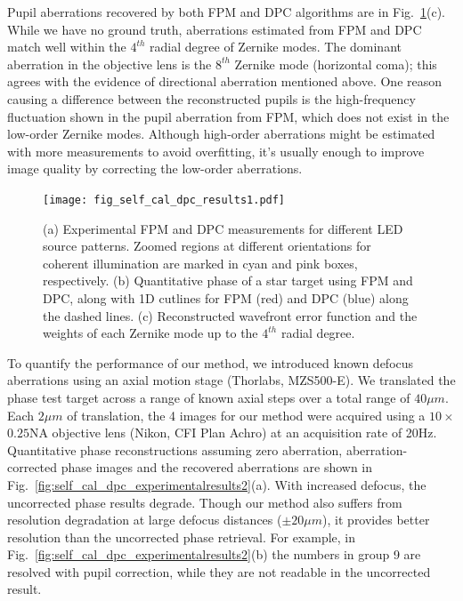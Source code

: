 Pupil aberrations recovered by both FPM and DPC algorithms are in Fig.~\ref{fig:self_cal_dpc_experimentalresults1}(c). While we have no ground truth, aberrations estimated from FPM and DPC match well within the $4^{th}$ radial degree of Zernike modes. The dominant aberration in the objective lens is the $8^{th}$ Zernike mode (horizontal coma); this agrees with the evidence of directional aberration mentioned above. One reason causing a difference between the reconstructed pupils is the high-frequency fluctuation shown in the pupil aberration from FPM, which does not exist in the low-order Zernike modes. Although high-order aberrations might be estimated with more measurements to avoid overfitting, it's usually enough to improve image quality by correcting the low-order aberrations.

\begin{figure}[ht!]
\centering\texttt{[image: fig\_self\_cal\_dpc\_results1.pdf]}
\caption{\label{fig:self_cal_dpc_experimentalresults1} (a) Experimental FPM and DPC measurements for different LED source patterns. Zoomed regions at different orientations for coherent illumination are marked in cyan and pink boxes, respectively. (b) Quantitative phase of a star target using FPM and DPC, along with 1D cutlines for FPM (red) and DPC (blue) along the dashed lines. (c) Reconstructed wavefront error function and the weights of each Zernike mode up to the $4^{th}$ radial degree.}
\end{figure}

To quantify the performance of our method, we introduced known defocus aberrations using an axial motion stage (Thorlabs, MZS500-E). We translated the phase test target across a range of known axial steps over a total range of $40 \mu m$. Each $2 \mu m$ of translation, the 4 images for our method were acquired using a $10\times$ $0.25 \mathrm{NA}$ objective lens (Nikon, CFI Plan Achro) at an acquisition rate of 20Hz. Quantitative phase reconstructions assuming zero aberration, aberration-corrected phase images and the recovered aberrations are shown in Fig.~\ref{fig:self_cal_dpc_experimentalresults2}(a). With increased defocus, the uncorrected phase results degrade. Though our method also suffers from resolution degradation at large defocus distances ($\pm 20\mu m$), it provides better resolution than the uncorrected phase retrieval. For example, in Fig.~\ref{fig:self_cal_dpc_experimentalresults2}(b) the numbers in group 9 are resolved with pupil correction, while they are not readable in the uncorrected result. 

